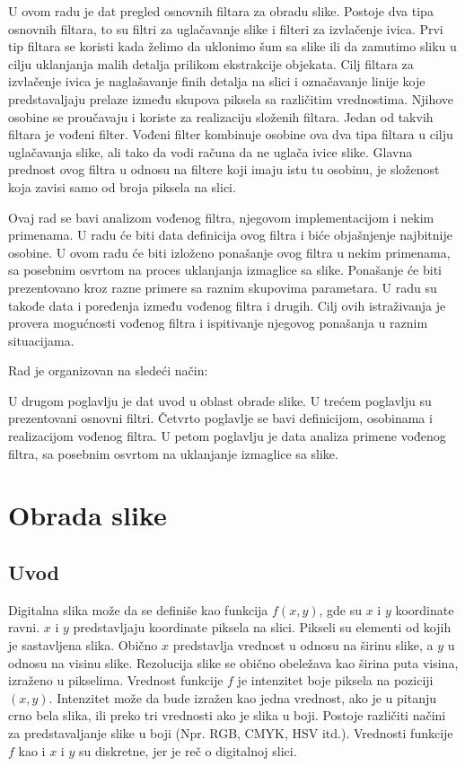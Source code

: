 \documentclass[a4paper,12pt,titlepage]{article}
\begin{document}
U ovom radu je dat pregled osnovnih filtara za obradu slike. Postoje dva tipa osnovnih filtara, to su filtri za uglačavanje slike i filteri za izvlačenje ivica. Prvi tip filtara se koristi kada želimo da uklonimo šum sa slike ili da zamutimo sliku u cilju uklanjanja malih detalja prilikom ekstrakcije objekata. Cilj filtara za izvlačenje ivica je naglašavanje finih detalja na slici i označavanje linije koje predstavaljaju prelaze između skupova piksela sa različitim vrednostima. Njihove osobine se proučavaju i koriste za realizaciju složenih filtara. Jedan od takvih filtara je vođeni filter. Vođeni filter kombinuje osobine ova dva tipa filtara u cilju uglačavanja slike, ali tako da vodi računa da ne uglača ivice slike. Glavna prednost ovog filtra u odnosu na filtere koji imaju istu tu osobinu, je složenost koja zavisi samo od broja piksela na slici. 

Ovaj rad se bavi analizom vođenog filtra, njegovom implementacijom i nekim primenama. U radu će biti data definicija ovog filtra i biće objašnjenje najbitnije osobine. U ovom radu će biti izloženo ponašanje ovog filtra u nekim primenama, sa posebnim osvrtom na proces uklanjanja izmaglice sa slike. Ponašanje će biti prezentovano kroz razne primere sa raznim skupovima parametara. U radu su takođe data i poređenja između vođenog filtra i drugih. Cilj ovih istraživanja je provera mogućnosti vođenog filtra i ispitivanje njegovog ponašanja u raznim situacijama. 

Rad je organizovan na sledeći način:

U drugom poglavlju je dat uvod u oblast obrade slike. U trećem poglavlju su prezentovani osnovni filtri. Četvrto poglavlje se bavi definicijom, osobinama i realizacijom vođenog filtra. U petom poglavlju je data analiza primene vođenog filtra, sa posebnim osvrtom na uklanjanje izmaglice sa slike.

\section{Obrada slike}%

\subsection{Uvod}%

Digitalna slika može da se definiše kao funkcija $f(x, y)$, gde su $x$ i $y$ koordinate ravni. $x$ i $y$ predstavljaju koordinate piksela na slici. Pikseli su elementi od kojih je sastavljena slika. Obično $x$ predstavlja vrednost u odnosu na širinu slike, a $y$ u odnosu na visinu slike. Rezolucija slike se obično obeležava kao širina puta visina, izraženo u pikselima. Vrednost funkcije $f$ je intenzitet boje piksela na poziciji $(x, y)$. Intenzitet može da bude izražen kao jedna vrednost, ako je u pitanju crno bela slika, ili preko tri vrednosti ako je slika u boji. Postoje različiti načini za predstavaljanje slike u boji (Npr. RGB, CMYK, HSV itd.). Vrednosti funkcije $f$ kao i $x$ i $y$ su diskretne, jer je reč o digitalnoj slici. 
 
\end{document}
